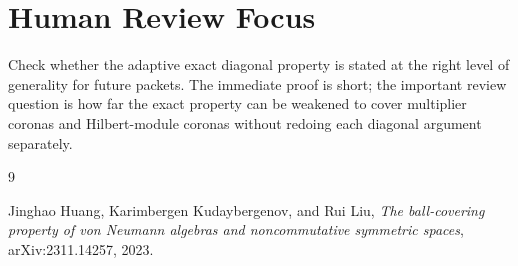 \documentclass[11pt]{article}
\begin{document}
\section*{Human Review Focus}

Check whether the adaptive exact diagonal property is stated at the right
level of generality for future packets.  The immediate proof is short; the
important review question is how far the exact property can be weakened to
cover multiplier coronas and Hilbert-module coronas without redoing each
diagonal argument separately.

\begin{thebibliography}{9}

Jinghao Huang, Karimbergen Kudaybergenov, and Rui Liu,
\emph{The ball-covering property of von Neumann algebras and noncommutative
symmetric spaces},
arXiv:2311.14257, 2023.

\end{thebibliography}
\end{document}
